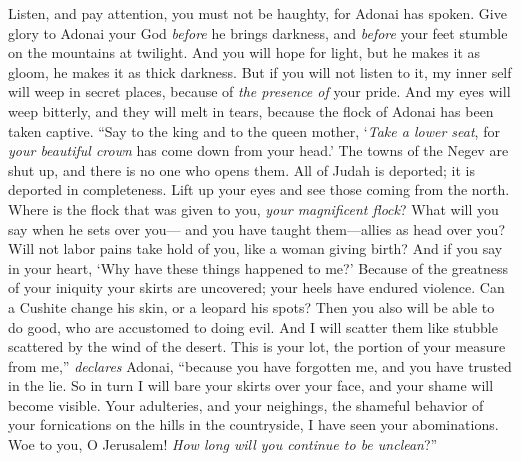 \begin{biblechapter}
\verse Listen, and pay attention, 
you must not be haughty, for Adonai has spoken.
\verse Give glory to Adonai your God \textit{before} he brings darkness, 
and \textit{before} your feet stumble on the mountains at twilight. 
And you will hope for light, but he makes it as gloom, 
he makes it as thick darkness.
\verse But if you will not listen to it, 
my inner self will weep in secret places, 
because of \textit{the presence of} your pride. 
And my eyes will weep bitterly, 
and they will melt in tears, 
because the flock of Adonai has been taken captive.
 “Say to the king and to the queen mother, ‘\textit{Take a lower seat}, 
for \textit{your beautiful crown} has come down from your head.’
\verse The towns of the Negev are shut up, 
and there is no one who opens them. 
All of Judah is deported; 
it is deported in completeness.
\verse Lift up your eyes 
and see those coming from the north. 
Where is the flock that was given to you, 
\textit{your magnificent flock}?
\verse What will you say when he sets over you— 
and you have taught them—allies as head over you? 
Will not labor pains take hold of you, 
like a woman giving birth?
\verse And if you say in your heart, 
‘Why have these things happened to me?’ 
Because of the greatness of your iniquity your skirts are uncovered; 
your heels have endured violence.
\verse Can a Cushite change his skin, 
or a leopard his spots? 
Then you also will be able to do good, 
who are accustomed to doing evil.
\verse And I will scatter them 
like stubble scattered by the wind of the desert.
\verse This is your lot, 
the portion of your measure from me,” \textit{declares} Adonai, 
“because you have forgotten me, 
and you have trusted in the lie.
\verse So in turn I will bare your skirts over your face, 
and your shame will become visible.
\verse Your adulteries, and your neighings, 
the shameful behavior of your fornications 
on the hills in the countryside, 
I have seen your abominations. 
Woe to you, O Jerusalem! 
\textit{How long will you continue to be unclean}?”
\end{biblechapter}


